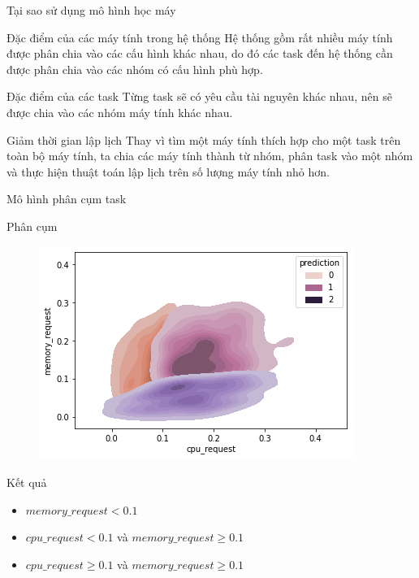 \documentclass[10pt,xcolor={dvipsnames}]{beamer}
\begin{document}
	\begin{frame}
	{Tại sao sử dụng mô hình học máy}
	\begin{block}
	{Đặc điểm của các máy tính trong hệ thống}
	Hệ thống gồm rất nhiều máy tính được phân chia vào các cấu hình khác nhau, do đó các task đến hệ thống cần được phân chia vào các nhóm có cấu hình phù hợp. 
	\end{block}
	
	\begin{block}
	{Đặc điểm của các task}
	Từng task sẽ có yêu cầu tài nguyên khác nhau, nên sẽ được chia vào các nhóm máy tính khác nhau. 
	\end{block}
	
	\begin{block}
	{Giảm thời gian lập lịch}
	Thay vì tìm một máy tính thích hợp cho một task trên toàn bộ máy tính, ta chia các máy tính thành từ nhóm, phân task vào một nhóm và thực hiện thuật toán lập lịch trên số lượng máy tính nhỏ hơn.
	\end{block}
	\end{frame}
	
	\begin{frame}
	{Mô hình phân cụm task}
	\begin{block}{Phân cụm}
		\begin{figure}
			\centering
			\includegraphics[scale=0.35]{images/task_cluster.png}
		\end{figure}
	\end{block}

	\begin{block}
	{Kết quả}
	\begin{itemize}
		\item $memory\_request < 0.1$
		\item $cpu\_request < 0.1$ và $memory\_request \geq 0.1$
		\item $cpu\_request \geq 0.1$ và $memory\_request \geq 0.1$
	\end{itemize}
	\end{block}		
	
	\end{frame}
	
\end{document}
